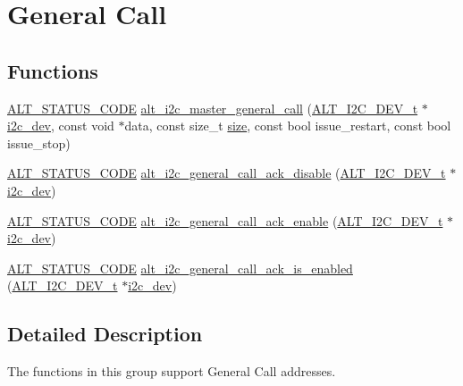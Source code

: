 \hypertarget{group__ALT__I2C__GEN__CALL}{}\section{General Call}
\label{group__ALT__I2C__GEN__CALL}
\subsection*{Functions}
\begin{DoxyCompactItemize}
\item 
\mbox{\hyperlink{hwlib_8h_abdb0d369f069723ca55d6c94bcaaaa12}{A\+L\+T\+\_\+\+S\+T\+A\+T\+U\+S\+\_\+\+C\+O\+DE}} \mbox{\hyperlink{group__ALT__I2C__GEN__CALL_gadf63bde5b3f565154bc4bd101176f1b2}{alt\+\_\+i2c\+\_\+master\+\_\+general\+\_\+call}} (\mbox{\hyperlink{structALT__I2C__DEV__s}{A\+L\+T\+\_\+\+I2\+C\+\_\+\+D\+E\+V\+\_\+t}} $\ast$\mbox{\hyperlink{structi2c__dev}{i2c\+\_\+dev}}, const void $\ast$data, const size\+\_\+t \mbox{\hyperlink{sun4u_2tte_8h_a245260f6f74972558f61b85227df5aae}{size}}, const bool issue\+\_\+restart, const bool issue\+\_\+stop)
\item 
\mbox{\hyperlink{hwlib_8h_abdb0d369f069723ca55d6c94bcaaaa12}{A\+L\+T\+\_\+\+S\+T\+A\+T\+U\+S\+\_\+\+C\+O\+DE}} \mbox{\hyperlink{group__ALT__I2C__GEN__CALL_gab82cad6cc438695db0f5c68e3447c422}{alt\+\_\+i2c\+\_\+general\+\_\+call\+\_\+ack\+\_\+disable}} (\mbox{\hyperlink{structALT__I2C__DEV__s}{A\+L\+T\+\_\+\+I2\+C\+\_\+\+D\+E\+V\+\_\+t}} $\ast$\mbox{\hyperlink{structi2c__dev}{i2c\+\_\+dev}})
\item 
\mbox{\hyperlink{hwlib_8h_abdb0d369f069723ca55d6c94bcaaaa12}{A\+L\+T\+\_\+\+S\+T\+A\+T\+U\+S\+\_\+\+C\+O\+DE}} \mbox{\hyperlink{group__ALT__I2C__GEN__CALL_ga649f8983f2840fbaa480ca33b2ff82b6}{alt\+\_\+i2c\+\_\+general\+\_\+call\+\_\+ack\+\_\+enable}} (\mbox{\hyperlink{structALT__I2C__DEV__s}{A\+L\+T\+\_\+\+I2\+C\+\_\+\+D\+E\+V\+\_\+t}} $\ast$\mbox{\hyperlink{structi2c__dev}{i2c\+\_\+dev}})
\item 
\mbox{\hyperlink{hwlib_8h_abdb0d369f069723ca55d6c94bcaaaa12}{A\+L\+T\+\_\+\+S\+T\+A\+T\+U\+S\+\_\+\+C\+O\+DE}} \mbox{\hyperlink{group__ALT__I2C__GEN__CALL_gadb0801fc81c23610fc980552c52dede4}{alt\+\_\+i2c\+\_\+general\+\_\+call\+\_\+ack\+\_\+is\+\_\+enabled}} (\mbox{\hyperlink{structALT__I2C__DEV__s}{A\+L\+T\+\_\+\+I2\+C\+\_\+\+D\+E\+V\+\_\+t}} $\ast$\mbox{\hyperlink{structi2c__dev}{i2c\+\_\+dev}})
\end{DoxyCompactItemize}


\subsection{Detailed Description}
The functions in this group support General Call addresses.

